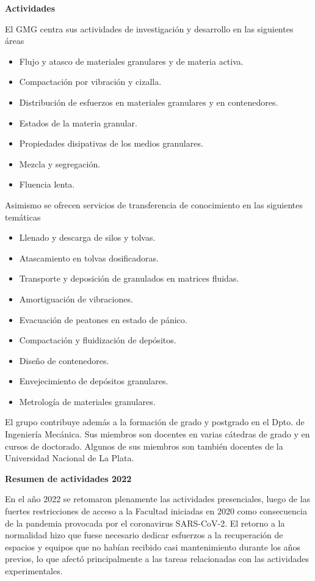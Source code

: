 \documentclass[a4paper,11pt,twoside,final,titlepage,onecolumn,openright]{report}
\begin{document}
\vspace{0.5cm}
{\bf Actividades}
\vspace{0.5cm}

El GMG centra sus actividades de investigación y desarrollo en las siguientes áreas

\begin{itemize}
 \item Flujo y atasco de materiales granulares y de materia activa.
 \item Compactación por vibración y cizalla.
 \item Distribución de esfuerzos en materiales granulares y en contenedores.
 \item Estados de la materia granular.
 \item Propiedades disipativas de los medios granulares.
 \item Mezcla y segregación.
 \item Fluencia lenta.
\end{itemize}

Asimismo se ofrecen servicios de transferencia de conocimiento en las siguientes temáticas

\begin{itemize}
 \item Llenado y descarga de silos y tolvas.
 \item Atascamiento en tolvas dosificadoras.
 \item Transporte y deposición de granulados en matrices fluidas.
 \item Amortiguación de vibraciones.
 \item Evacuación de peatones en estado de pánico.
 \item Compactación y fluidización de depósitos.
 \item Diseño de contenedores.
 \item Envejecimiento de depósitos granulares.
 \item Metrología de materiales granulares.
\end{itemize}

El grupo contribuye además a la formación de grado y postgrado en el Dpto. de Ingeniería Mecánica. Sus miembros son docentes en varias cátedras de grado y en cursos de doctorado. Algunos de sus miembros son también docentes de la Universidad Nacional de La Plata.

\vspace{0.5cm}

{\bf Resumen de actividades 2022}

En el año 2022 se retomaron plenamente las actividades presenciales, luego de las fuertes restricciones de acceso a la Facultad iniciadas en 2020 como consecuencia de la pandemia provocada por el coronavirus SARS-CoV-2. El retorno a la normalidad hizo que fuese necesario dedicar esfuerzos a la recuperación de espacios y equipos que no habían recibido casi mantenimiento durante los años previos, lo que afectó principalmente a las tareas relacionadas con las actividades experimentales.
\end{document}
